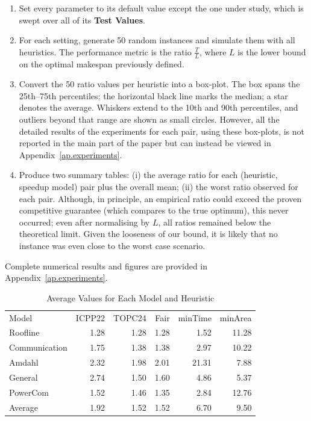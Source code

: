 \documentclass{article}
\begin{document}
\begin{enumerate}
    \item Set every parameter to its default value except the one under study,
          which is swept over all of its \textbf{Test Values}.
    \item For each setting, generate 50 random instances and simulate them with
          all heuristics.  
          The performance metric is the ratio \(\tfrac{T}{L}\), where \(L\) is the lower bound on the optimal makespan previously defined.
    \item Convert the 50 ratio values per heuristic into a box-plot.
          The box spans the 25th–75th percentiles; the horizontal black line
          marks the median; a star denotes the average.
          Whiskers extend to the 10th and 90th percentiles, and outliers
          beyond that range are shown as small circles. However, all the detailed results of the experiments for each pair, using these box-plots, is not reported in the main part of the paper but can instead be viewed in Appendix~\ref{ap.experiments}.
    \item Produce two summary tables:  
          (i) the average ratio for each (heuristic, speedup model)
          pair plus the overall mean;  
          (ii) the worst ratio observed for each pair.
          Although, in principle, an empirical ratio could exceed the proven
          competitive guarantee (which compares to the true optimum), this
          never occurred; even after normalising by \(L\), all ratios remained
          below the theoretical limit. Given the looseness of our bound, it is likely that no instance was even close to the worst case scenario.
\end{enumerate}

Complete numerical results and figures are provided in
Appendix~\ref{ap.experiments}.

\begin{table}[htbp]
\centering
\caption{Average Values for Each Model and Heuristic}
\label{tab:average_values}
\begin{tabular}{lrrrrr}
\toprule
Model & ICPP22 & TOPC24 & Fair & minTime & minArea \\
Roofline & 1.28 & 1.28 & 1.28 & 1.52 & 11.28 \\
Communication & 1.75 & 1.38 & 1.38 & 2.97 & 10.22 \\
Amdahl & 2.32 & 1.98 & 2.01 & 21.31 & 7.88 \\
General & 2.74 & 1.50 & 1.60 & 4.86 & 5.37 \\
PowerCom & 1.52 & 1.46 & 1.35 & 2.84 & 12.76 \\
\midrule
Average & 1.92 & 1.52 & 1.52 & 6.70 & 9.50 \\
\bottomrule
\end{tabular}
\end{table}
\end{document}
